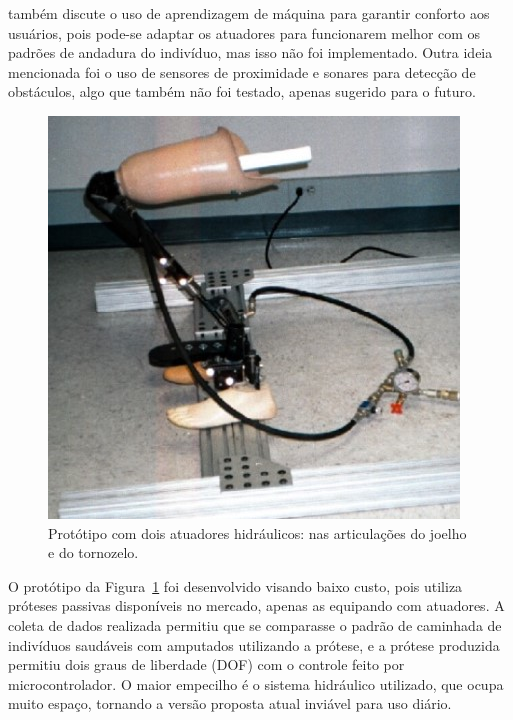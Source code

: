  também discute o uso de aprendizagem de máquina para garantir conforto aos usuários, pois pode-se adaptar os atuadores para funcionarem melhor com os padrões de andadura do indivíduo, mas isso não foi implementado. Outra ideia mencionada foi o uso de sensores de proximidade e sonares para detecção de obstáculos, algo que também não foi testado, apenas sugerido para o futuro.

\begin{figure}[ht]
	\caption{\label{fig:rel_smartleg_1}Protótipo com dois atuadores hidráulicos: nas articulações do joelho e do tornozelo.}
	\begin{center}
	    \includegraphics[width=.5\textwidth]{resources/rel_dedic_smart_leg_1}
	\end{center}
\end{figure}

O protótipo da Figura~\ref{fig:rel_smartleg_1} foi desenvolvido visando baixo custo, pois utiliza próteses passivas disponíveis no mercado, apenas as equipando com atuadores. A coleta de dados realizada permitiu que se comparasse o padrão de caminhada de indivíduos saudáveis com amputados utilizando a prótese, e a prótese produzida permitiu dois graus de liberdade (DOF) com o controle feito por microcontrolador. O maior empecilho é o sistema hidráulico utilizado, que ocupa muito espaço, tornando a versão proposta atual inviável para uso diário.


